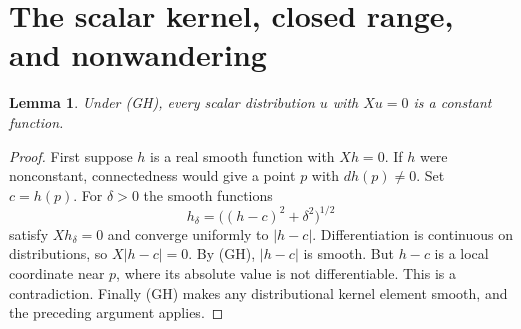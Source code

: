 \documentclass[11pt]{article}
\newtheorem{lemma}[theorem]{Lemma}
\theoremstyle{definition}
\theoremstyle{remark}
\begin{document}
\section{The scalar kernel, closed range, and nonwandering}
\label{sec:regularity}

\begin{lemma}\label{lem:kernel}
Under (GH), every scalar distribution $u$ with $Xu=0$ is a constant function.
\end{lemma}
\begin{proof}
First suppose $h$ is a real smooth function with $Xh=0$. If $h$ were nonconstant, connectedness would give a point $p$ with $dh(p)\ne0$. Set $c=h(p)$. For $\delta>0$ the smooth functions
\[
 h_\delta=\big((h-c)^2+\delta^2\big)^{1/2}
\]
satisfy $Xh_\delta=0$ and converge uniformly to $|h-c|$. Differentiation is continuous on distributions, so $X|h-c|=0$. By (GH), $|h-c|$ is smooth. But $h-c$ is a local coordinate near $p$, where its absolute value is not differentiable. This is a contradiction. Finally (GH) makes any distributional kernel element smooth, and the preceding argument applies.
\end{proof}
\end{document}
